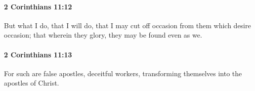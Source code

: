 		\paragraph{2 Corinthians 11:12} %
			\label{2CORINTHIANS-11-12}

			But what I do, that I will do, that I may cut off occasion from them which desire occasion; that wherein they glory, they may be found even as we.

			\begin{framed}
			\scriptsize
				\begin{compactdesc}
					\item[SBLG] 
				\end{compactdesc}
			\end{framed}

		\paragraph{2 Corinthians 11:13} %
			\label{2CORINTHIANS-11-13}

			For such are false apostles, deceitful workers, transforming themselves into the apostles of Christ.

